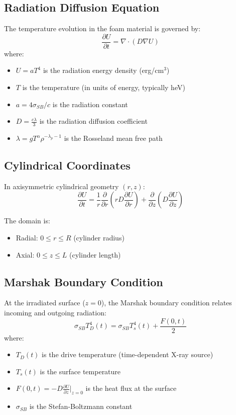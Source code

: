\documentclass[12pt,a4paper]{article}
\begin{document}
\subsection{Radiation Diffusion Equation}

The temperature evolution in the foam material is governed by:
\begin{equation}
\frac{\partial U}{\partial t} = \nabla \cdot (D \nabla U)
\end{equation}
where:
\begin{itemize}
    \item $U = a T^4$ is the radiation energy density (erg/cm$^3$)
    \item $T$ is the temperature (in units of energy, typically heV)
    \item $a = 4\sigma_{SB}/c$ is the radiation constant
    \item $D = \frac{c\lambda}{3}$ is the radiation diffusion coefficient
    \item $\lambda = g T^\alpha \rho^{-\lambda_p - 1}$ is the Rosseland mean free path
\end{itemize}

\subsection{Cylindrical Coordinates}

In axisymmetric cylindrical geometry $(r,z)$:
\begin{equation}
\frac{\partial U}{\partial t} = \frac{1}{r}\frac{\partial}{\partial r}\left(r D \frac{\partial U}{\partial r}\right) + \frac{\partial}{\partial z}\left(D \frac{\partial U}{\partial z}\right)
\end{equation}

The domain is:
\begin{itemize}
    \item Radial: $0 \leq r \leq R$ (cylinder radius)
    \item Axial: $0 \leq z \leq L$ (cylinder length)
\end{itemize}

\subsection{Marshak Boundary Condition}

At the irradiated surface ($z=0$), the Marshak boundary condition relates incoming and outgoing radiation:
\begin{equation}
\sigma_{SB} T_D^4(t) = \sigma_{SB} T_s^4(t) + \frac{F(0,t)}{2}
\end{equation}
where:
\begin{itemize}
    \item $T_D(t)$ is the drive temperature (time-dependent X-ray source)
    \item $T_s(t)$ is the surface temperature
    \item $F(0,t) = -D\frac{\partial U}{\partial z}\big|_{z=0}$ is the heat flux at the surface
    \item $\sigma_{SB}$ is the Stefan-Boltzmann constant
\end{itemize}
\end{document}
